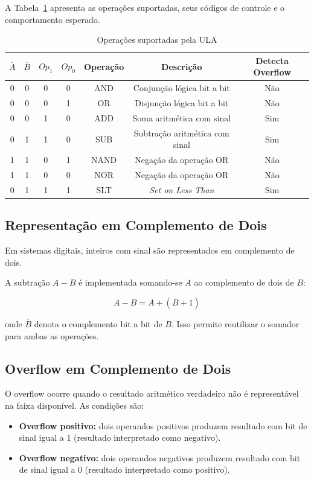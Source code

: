 \documentclass[a4paper,12pt]{article}
\begin{document}
A Tabela~\ref{tab:ops} apresenta as operações suportadas, seus códigos de controle
e o comportamento esperado.

\begin{table}[H]
\centering
\caption{Operações suportadas pela ULA}
\label{tab:ops}
\begin{tabular}{ccccccc}
\toprule
\textbf{$\overline{A}$} & \textbf{$\overline{B}$} & \textbf{$Op_1$} & \textbf{$Op_0$} & \textbf{Operação} & \textbf{Descrição} & \textbf{Detecta Overflow} \\
\midrule
0 & 0 & 0 & 0 & AND & Conjunção lógica bit a bit & Não \\
0 & 0 & 0 & 1 & OR & Disjunção lógica bit a bit & Não \\
0 & 0 & 1 & 0 & ADD & Soma aritmética com sinal & Sim \\
0 & 1 & 1 & 0 & SUB & Subtração aritmética com sinal & Sim \\
1 & 1 & 0 & 1 & NAND & Negação da operação OR & Não \\
1 & 1 & 0 & 0 & NOR & Negação da operação OR & Não \\
0    & 1 & 1 & 1 & SLT & \textit{Set on Less Than} & Sim \\
\bottomrule
\end{tabular}
\end{table}

\subsection{Representação em Complemento de Dois}

Em sistemas digitais, inteiros com sinal são representados em complemento de dois.

A subtração $A - B$ é implementada somando-se $A$ ao complemento de dois de $B$:

\[
    A - B = A + (\overline{B} + 1)
\]

onde $\overline{B}$ denota o complemento bit a bit de $B$. Isso permite reutilizar
o somador para ambas as operações.

\subsection{Overflow em Complemento de Dois}

O overflow ocorre quando o resultado aritmético verdadeiro não é representável na
faixa disponível. As condições são:

\begin{itemize}
    \item \textbf{Overflow positivo:} dois operandos positivos produzem resultado
          com bit de sinal igual a 1 (resultado interpretado como negativo).
    \item \textbf{Overflow negativo:} dois operandos negativos produzem resultado
          com bit de sinal igual a 0 (resultado interpretado como positivo).
\end{itemize}
\end{document}

